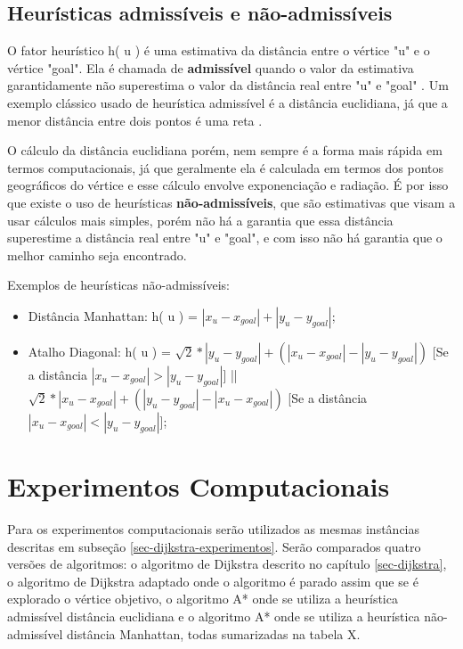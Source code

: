 \subsection{Heurísticas admissíveis e não-admissíveis}
\label{sec-aestrela-algoritmo-heuristica}  
O fator heurístico h( u ) é uma estimativa da distância entre o vértice "u" e o vértice "goal". Ela é chamada de \textbf{admissível} quando o valor da estimativa garantidamente não superestima o valor da distância real entre "u" e "goal" \cite{russell1995modern}. Um exemplo clássico usado de heurística admissível é a distância euclidiana, já que a menor distância entre dois pontos é uma reta \cite{russell1995modern}.

O cálculo da distância euclidiana porém, nem sempre é a forma mais rápida em termos computacionais, já que geralmente ela é calculada em termos dos pontos geográficos do vértice e esse cálculo envolve exponenciação e radiação. É por isso que existe o uso de heurísticas \textbf{não-admissíveis}, que são estimativas que visam a usar cálculos mais simples, porém não há a garantia que essa distância superestime a distância real entre "u" e "goal", e com isso não há garantia que o melhor caminho seja encontrado.

Exemplos de heurísticas não-admissíveis:
\begin{itemize}
\item Distância Manhattan: h( u ) = $| x_{u} - x_{goal} | + | y_{u} - y_{goal}|$;
\item Atalho Diagonal: h( u ) = $\sqrt{2} * | y_{u} - y_{goal}| + ( | x_{u} - x_{goal} | - | y_{u} - y_{goal}| )$ [Se a distância $| x_{u} - x_{goal} | > | y_{u} - y_{goal}|$] || $\sqrt{2} * | x_{u} - x_{goal}| + ( | y_{u} - y_{goal}| - | x_{u} - x_{goal} | )$ [Se a distância $| x_{u} - x_{goal} | < | y_{u} - y_{goal}|$];
\end{itemize}

\section{Experimentos Computacionais}
\label{sec-aestrela-experimentos}

Para os experimentos computacionais serão utilizados as mesmas instâncias descritas em subseção \ref{sec-dijkstra-experimentos}. Serão comparados quatro versões de algoritmos: o algoritmo de Dijkstra descrito no capítulo \ref{sec-dijkstra}, o algoritmo de Dijkstra adaptado onde o algoritmo é parado assim que se é explorado o vértice objetivo, o algoritmo A* onde se utiliza a heurística admissível distância euclidiana e o algoritmo A* onde se utiliza a heurística não-admissível distância Manhattan, todas sumarizadas na tabela X.
